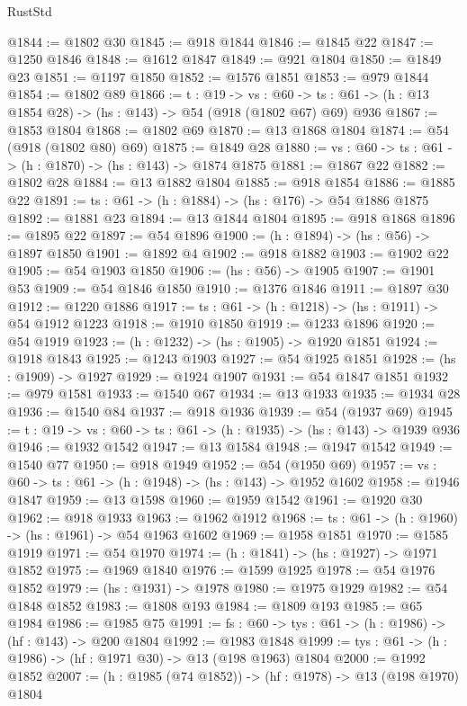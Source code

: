 \begin{lexlean}{RustStd}
\begin{coremodule}
@1844 := @1802 @30
@1845 := @918 @1844
@1846 := @1845 @22
@1847 := @1250 @1846
@1848 := @1612 @1847
@1849 := @921 @1804
@1850 := @1849 @23
@1851 := @1197 @1850
@1852 := @1576 @1851
@1853 := @979 @1844
@1854 := @1802 @89
@1866 := {t : @19} ->
  {vs : @60} -> {ts : @61} -> (h : @13 @1854 @28) -> (hs : @143) -> @54 (@918 (@1802 @67) @69) @936
@1867 := @1853 @1804
@1868 := @1802 @69
@1870 := @13 @1868 @1804
@1874 := @54 (@918 (@1802 @80) @69)
@1875 := @1849 @28
@1880 := {vs : @60} -> {ts : @61} -> (h : @1870) -> (hs : @143) -> @1874 @1875
@1881 := @1867 @22
@1882 := @1802 @28
@1884 := @13 @1882 @1804
@1885 := @918 @1854
@1886 := @1885 @22
@1891 := {ts : @61} -> (h : @1884) -> (hs : @176) -> @54 @1886 @1875
@1892 := @1881 @23
@1894 := @13 @1844 @1804
@1895 := @918 @1868
@1896 := @1895 @22
@1897 := @54 @1896
@1900 := (h : @1894) -> (hs : @56) -> @1897 @1850
@1901 := @1892 @4
@1902 := @918 @1882
@1903 := @1902 @22
@1905 := @54 @1903 @1850
@1906 := (hs : @56) -> @1905
@1907 := @1901 @53
@1909 := @54 @1846 @1850
@1910 := @1376 @1846
@1911 := @1897 @30
@1912 := @1220 @1886
@1917 := {ts : @61} -> (h : @1218) -> (hs : @1911) -> @54 @1912 @1223
@1918 := @1910 @1850
@1919 := @1233 @1896
@1920 := @54 @1919
@1923 := (h : @1232) -> (hs : @1905) -> @1920 @1851
@1924 := @1918 @1843
@1925 := @1243 @1903
@1927 := @54 @1925 @1851
@1928 := (hs : @1909) -> @1927
@1929 := @1924 @1907
@1931 := @54 @1847 @1851
@1932 := @979 @1581
@1933 := @1540 @67
@1934 := @13 @1933
@1935 := @1934 @28
@1936 := @1540 @84
@1937 := @918 @1936
@1939 := @54 (@1937 @69)
@1945 := {t : @19} -> {vs : @60} -> {ts : @61} -> (h : @1935) -> (hs : @143) -> @1939 @936
@1946 := @1932 @1542
@1947 := @13 @1584
@1948 := @1947 @1542
@1949 := @1540 @77
@1950 := @918 @1949
@1952 := @54 (@1950 @69)
@1957 := {vs : @60} -> {ts : @61} -> (h : @1948) -> (hs : @143) -> @1952 @1602
@1958 := @1946 @1847
@1959 := @13 @1598
@1960 := @1959 @1542
@1961 := @1920 @30
@1962 := @918 @1933
@1963 := @1962 @1912
@1968 := {ts : @61} -> (h : @1960) -> (hs : @1961) -> @54 @1963 @1602
@1969 := @1958 @1851
@1970 := @1585 @1919
@1971 := @54 @1970
@1974 := (h : @1841) -> (hs : @1927) -> @1971 @1852
@1975 := @1969 @1840
@1976 := @1599 @1925
@1978 := @54 @1976 @1852
@1979 := (hs : @1931) -> @1978
@1980 := @1975 @1929
@1982 := @54 @1848 @1852
@1983 := @1808 @193
@1984 := @1809 @193
@1985 := @65 @1984
@1986 := @1985 @75
@1991 := {fs : @60} -> {tys : @61} -> (h : @1986) -> (hf : @143) -> @200 @1804
@1992 := @1983 @1848
@1999 := {tys : @61} -> (h : @1986) -> (hf : @1971 @30) -> @13 (@198 @1963) @1804
@2000 := @1992 @1852
@2007 := (h : @1985 (@74 @1852)) -> (hf : @1978) -> @13 (@198 @1970) @1804

\end{coremodule}
\end{lexlean}
